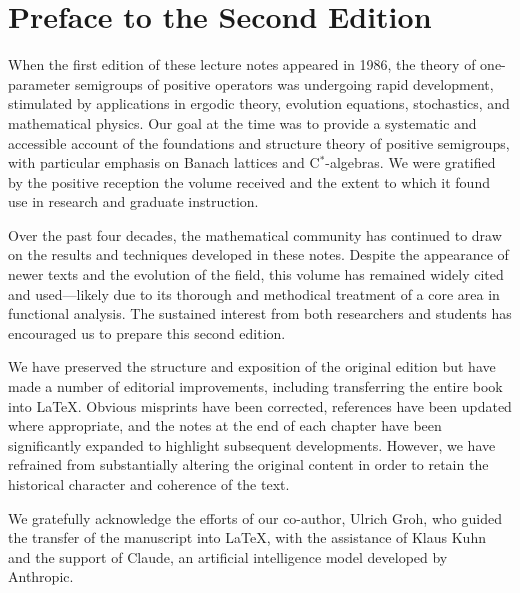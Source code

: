 %

\preface

\section*{Preface to the Second Edition}
	
	When the first edition of these lecture notes appeared in 1986, the theory of one-parameter semigroups of positive operators was undergoing rapid development, stimulated by applications in ergodic theory, evolution equations, stochastics, and mathematical physics. 
	Our goal at the time was to provide a systematic and accessible account of the foundations and structure theory of positive semigroups, with particular emphasis on Banach lattices and C$^*$-algebras.
	We were gratified by the positive reception the volume received and the extent to which it found use in research and graduate instruction.
	
	Over the past four decades, the mathematical community has continued to draw on the results and techniques developed in these notes. 
	Despite the appearance of newer texts and the evolution of the field, this volume has remained widely cited and used—likely due to its thorough and methodical treatment of a core area in functional analysis. 
	The sustained interest from both researchers and students has encouraged us to prepare this second edition.
	
	We have preserved the structure and exposition of the original edition but have made a number of editorial improvements, including transferring the entire book into \LaTeX{}. 
	Obvious misprints have been corrected, references have been updated where appropriate, and the notes at the end of each chapter have been significantly expanded to highlight subsequent developments. 
	However, we have refrained from substantially altering the original content in order to retain the historical character and coherence of the text.
	
	We gratefully acknowledge the efforts of our co-author, Ulrich Groh, who guided the transfer of the manuscript into \LaTeX{}, with the assistance of Klaus Kuhn and the support of Claude, an artificial intelligence model developed by Anthropic.
	
